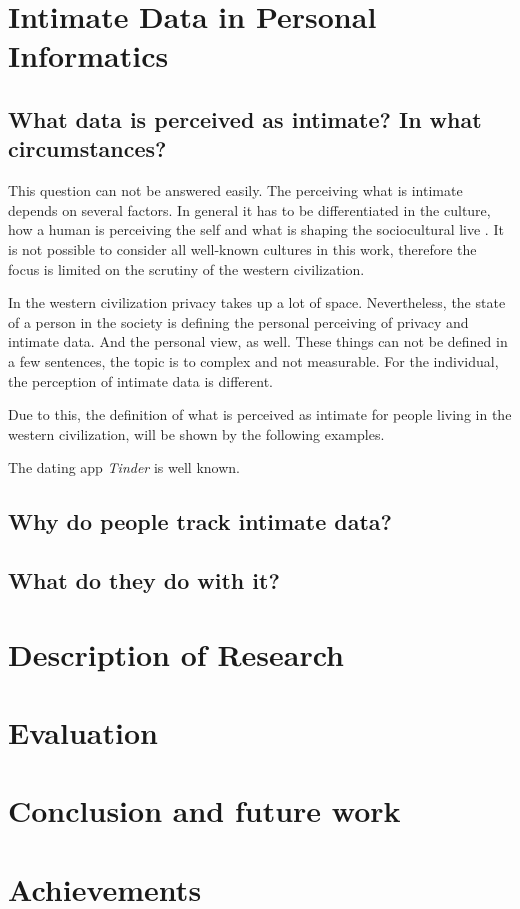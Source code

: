 \documentclass[journal]{vgtc}                %
\begin{document}
\section{Intimate Data in Personal Informatics}
\label{sec:intimateData}
\subsection{What data is perceived as intimate? In what circumstances?}
This question can not be answered easily. The perceiving what is intimate depends on several factors.
In general it has to be differentiated in the culture, how a human is perceiving the self and what is shaping the sociocultural live \cite{carrithers1985category}. It is not possible to consider all well-known cultures in this work, therefore the focus is limited on the scrutiny of the western civilization. 

In the western civilization privacy takes up a lot of space. Nevertheless, the state of a person in the society is defining the personal perceiving of privacy and intimate data. And the personal view, as well.
These things can not be defined in a few sentences, the topic is to complex and not measurable. For the individual, the perception of intimate data is different.

Due to this, the definition of what is perceived as intimate for people living in the western civilization, will be shown by the following examples.

The dating app \textit{Tinder} is well known.

\subsection{Why do people track intimate data?}

\subsection{What do they do with it?}

\section{Description of Research}
\label{sec:methodology}
\section{Evaluation}
\label{sec:evaluation}
\section{Conclusion and future work}
\label{sec:conculsion}
\section{Achievements}

\printbibliography
\end{document}
